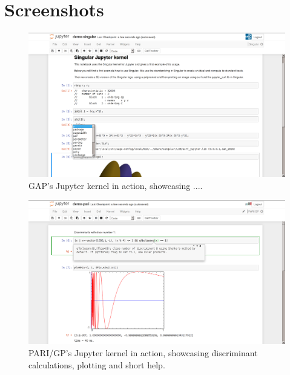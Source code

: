 \documentclass{deliverablereport}
\author{Nicolas M. Thiéry}
\begin{document}
\maketitle
\githubissuedescription
\tableofcontents
\clearpage
\section{Screenshots}
\begin{figure}[ht]
  \includegraphics[width=140mm,trim={0 0 0 1px},clip]{singular.png}
  \caption{GAP's Jupyter kernel in action, showcasing ....}
\end{figure}
\begin{figure}[ht]
  \includegraphics[width=140mm,trim={0 0 0 1px},clip]{pari.png}
  \caption{PARI/GP's Jupyter kernel in action, showcasing
    discriminant calculations, plotting and short help.}
\end{figure}
\end{document}

